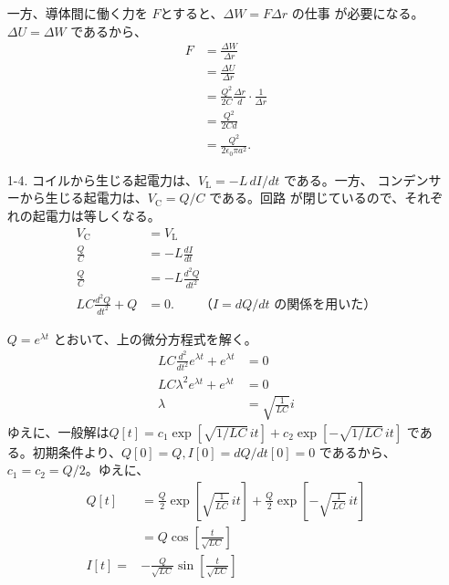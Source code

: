 \documentclass[report]{dennou777}
\begin{document}
\begin{itemize}
		一方、導体間に働く力を $F$とすると、$\Delta W=F\Delta r$ の仕事
		が必要になる。$\Delta U=\Delta W$ であるから、
		\begin{align*}
			F&=\frac{\Delta W}{\Delta r}\\
			&=\frac{\Delta U}{\Delta r}\\
			&=\frac{Q^2}{2C}\frac{\Delta r}{d}\cdot\frac{1}{\Delta r}\\
			&=\frac{Q^2}{2Cd}\\
			&=\frac{Q^2}{2\epsilon_0\pi a^2}.
		\end{align*}
	\item[1-4.]
		コイルから生じる起電力は、$V_{\mathrm{L}}=-L\,dI/dt$ である。一方、
		コンデンサーから生じる起電力は、$V_{\mathrm{C}}=Q/C$ である。回路
		が閉じているので、それぞれの起電力は等しくなる。
		\begin{align*}
			V_{\mathrm{C}}&=V_{\mathrm{L}}\\
			\frac{Q}{C}&=-L\frac{dI}{dt}\\
			\frac{Q}{C}&=-L\frac{d^2Q}{dt^2}\\
			LC\frac{d^2Q}{dt^2}+Q&=0.\qquad\text{（$I=dQ/dt$ の関係を用いた）}
		\end{align*}

		$Q=e^{\lambda t}$ とおいて、上の微分方程式を解く。
		\begin{align*}
			LC\frac{d^2}{dt^2}e^{\lambda t}+e^{\lambda t}&=0\\
			LC\lambda^2e^{\lambda t}+e^{\lambda t}&=0\\
			\lambda&=\sqrt{\frac{1}{LC}}i
		\end{align*}
		ゆえに、一般解は$Q[t]=c_1\exp[\sqrt{1/LC}\,it]+c_2\exp[-\sqrt{1/LC}\,it]$
		である。初期条件より、$Q[0]=Q, I[0]=dQ/dt[0]=0$ であるから、
		$c_1=c_2=Q/2$。ゆえに、
		\begin{align*}
			Q[t]&=\frac{Q}{2}\exp\left[\sqrt{\frac{1}{LC}}\,it\right]
				+\frac{Q}{2}\exp\left[-\sqrt{\frac{1}{LC}}\,it\right]\\
			&=Q\cos\left[\frac{t}{\sqrt{LC}}\right]\\
			I[t]=&-\frac{Q}{\sqrt{LC}}\sin\left[\frac{t}{\sqrt{LC}}\right]
		\end{align*}
\end{itemize}
\end{document}
